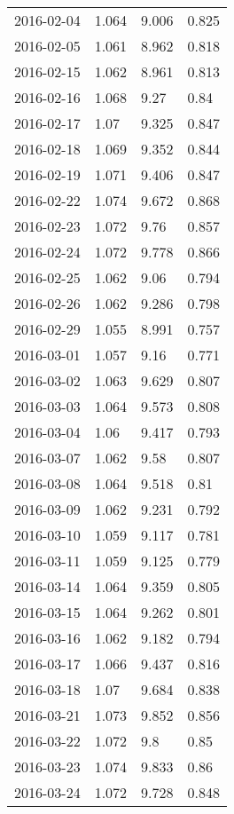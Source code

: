 \begin{center}
\begin{longtable}{r lll}
    2016-02-04 & 1.064  & 9.006  & 0.825  \\
    2016-02-05 & 1.061  & 8.962  & 0.818  \\
    2016-02-15 & 1.062  & 8.961  & 0.813  \\
    2016-02-16 & 1.068  & 9.27   & 0.84   \\
    2016-02-17 & 1.07   & 9.325  & 0.847  \\
    2016-02-18 & 1.069  & 9.352  & 0.844  \\
    2016-02-19 & 1.071  & 9.406  & 0.847  \\
    2016-02-22 & 1.074  & 9.672  & 0.868  \\
    2016-02-23 & 1.072  & 9.76   & 0.857  \\
    2016-02-24 & 1.072  & 9.778  & 0.866  \\
    2016-02-25 & 1.062  & 9.06   & 0.794  \\
    2016-02-26 & 1.062  & 9.286  & 0.798  \\
    2016-02-29 & 1.055  & 8.991  & 0.757  \\
    2016-03-01 & 1.057  & 9.16   & 0.771  \\
    2016-03-02 & 1.063  & 9.629  & 0.807  \\
    2016-03-03 & 1.064  & 9.573  & 0.808  \\
    2016-03-04 & 1.06   & 9.417  & 0.793  \\
    2016-03-07 & 1.062  & 9.58   & 0.807  \\
    2016-03-08 & 1.064  & 9.518  & 0.81   \\
    2016-03-09 & 1.062  & 9.231  & 0.792  \\
    2016-03-10 & 1.059  & 9.117  & 0.781  \\
    2016-03-11 & 1.059  & 9.125  & 0.779  \\
    2016-03-14 & 1.064  & 9.359  & 0.805  \\
    2016-03-15 & 1.064  & 9.262  & 0.801  \\
    2016-03-16 & 1.062  & 9.182  & 0.794  \\
    2016-03-17 & 1.066  & 9.437  & 0.816  \\
    2016-03-18 & 1.07   & 9.684  & 0.838  \\
    2016-03-21 & 1.073  & 9.852  & 0.856  \\
    2016-03-22 & 1.072  & 9.8    & 0.85   \\
    2016-03-23 & 1.074  & 9.833  & 0.86   \\
    2016-03-24 & 1.072  & 9.728  & 0.848  \\

\end{longtable}
\end{center}
